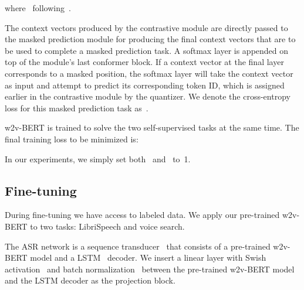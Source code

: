 \documentclass{article}
\begin{document}
where~ following~\cite{baevski2020wav2vec}.

The context vectors produced by the contrastive module are directly passed to the masked prediction module for producing the final context vectors that are to be used to complete a masked prediction task.
A softmax layer is appended on top of the module's last conformer block.
If a context vector at the final layer corresponds to a masked position, the softmax layer will take the context vector as input and attempt to predict its corresponding token ID, which is assigned earlier in the contrastive module by the quantizer.
We denote the cross-entropy loss for this masked prediction task as~.

w2v-BERT is trained to solve the two self-supervised tasks at the same time.
The final training loss to be minimized is:

In our experiments, we simply set both~ and~ to~1.

\subsection{Fine-tuning}
During fine-tuning we have access to labeled data.
We apply our pre-trained w2v-BERT to two tasks: LibriSpeech and voice search.

The ASR network is a sequence transducer~\cite{graves2012sequence} that consists of a pre-trained w2v-BERT model and a LSTM~\cite{hochreiter1997long} decoder.
We insert a linear layer with Swish activation~\cite{ramachandran2017searching} and batch normalization~\cite{ioffe2015batch} between the pre-trained w2v-BERT model and the LSTM decoder as the projection block.
\end{document}
